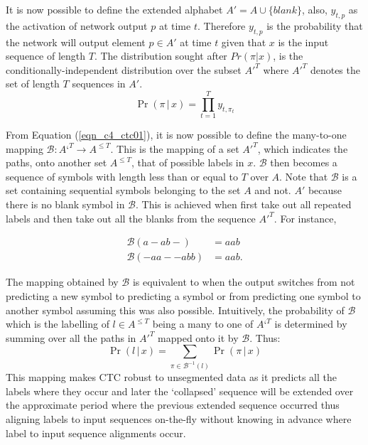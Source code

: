 It is now possible to define the extended alphabet $A' = A \cup \{blank\}$, also, $y_{t,p}$ as the activation of network output $p$ at time $t$.  Therefore $y_{t,p}$  is the probability that the network will output element $p \in A'$ at time $t$ given that $x$ is the input sequence of length $T$.  The distribution sought after $Pr(\pi|x)$, is the conditionally-independent distribution over the subset $A'^T$ where $A'^T$ denotes the set of length $T$ sequences in $A'$. 
\begin{equation}
\Pr( \pi \, | \, x ) = \prod_{t=1}^{T} y_{t,\pi_t}
\label{eqn_c4_ctc01}\end{equation}

From Equation (\ref{eqn_c4_ctc01}), it is now possible to define the many-to-one mapping $\mathcal{B} : {A‘}^T \rightarrow A^{\le T}$.  This is the mapping of a set $A'^T$,  which indicates the paths, onto another set  $A^{\le T}$, that of possible labels in $x$.  $\mathcal{B}$ then becomes a sequence of symbols with length less than or equal to $T$ over $A$. Note that $\mathcal{B}$ is a set containing sequential symbols belonging to the set $A$ and not. $A'$ because there is no blank symbol in $\mathcal{B}$.  This is achieved when first take out all repeated labels and then take out all the blanks from the sequence $A'^T$. For instance,

\begin{equation}\begin{aligned}\mathcal{B}(a - ab-) &= aab \\ \mathcal{B}(-aa - -abb) &= aab.\end{aligned} \label{eqn_c3_ctc02}
\end{equation}

The mapping obtained by $\mathcal{B}$ is equivalent to when the output switches from not predicting a new symbol to predicting a symbol or from predicting one symbol to another symbol assuming this was also possible.  Intuitively, the probability of $\mathcal{B}$ which is the labelling of $l \in A^{\le T}$ being a many to one of $A‘^T$ is determined by summing over all the paths in $A'^T$ mapped onto it by $\mathcal{B}$.  Thus:
\begin{equation}
\Pr( l \, | \, x) = \sum_{\pi \in \mathcal{B}^{-1}(l)} \Pr( \pi \, | \, x)
\label{eqn_c3_ct03}\end{equation}
This mapping makes CTC robust to unsegmented data as it predicts all the labels where they occur and later the ‘collapsed’ sequence will be extended over the approximate period where the previous extended sequence occurred thus aligning labels to input sequences on-the-fly without knowing in advance where label to input sequence alignments occur.

